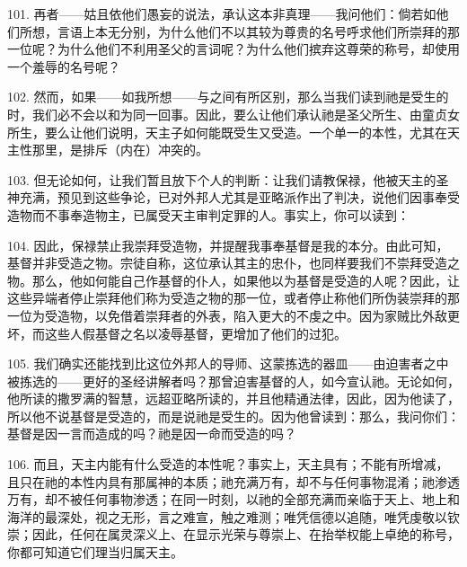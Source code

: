 101. 再者——姑且依他们愚妄的说法，承认这本非真理——我问他们：倘若如他们所想，言语上本无分别，为什么他们不以其较为尊贵的名号呼求他们所崇拜的那一位呢？为什么他们不利用圣父的言词呢？为什么他们摈弃这尊荣的称号，却使用一个羞辱的名号呢？\par

102. 然而，如果——如我所想——与之间有所区别，那么当我们读到祂是受生的时，我们必不会以和为同一回事。因此，要么让他们承认祂是圣父所生、由童贞女所生，要么让他们说明，天主子如何能既受生又受造。一个单一的本性，尤其在天主性那里，是排斥（内在）冲突的。\par

103. 但无论如何，让我们暂且放下个人的判断：让我们请教保禄，他被天主的圣神充满，预见到这些争论，已对外邦人尤其是亚略派作出了判决，说他们因事奉受造物而不事奉造物主，已属受天主审判定罪的人。事实上，你可以读到：\par

104. 因此，保禄禁止我崇拜受造物，并提醒我事奉基督是我的本分。由此可知，基督并非受造之物。宗徒自称，这位承认其主的忠仆，也同样要我们不崇拜受造之物。那么，他如何能自己作基督的仆人，如果他以为基督是受造的人呢？因此，让这些异端者停止崇拜他们称为受造之物的那一位，或者停止称他们所伪装崇拜的那一位为受造物，以免借着崇拜者的外表，陷入更大的不虔之中。因为家贼比外敌更坏，而这些人假基督之名以凌辱基督，更增加了他们的过犯。\par

105. 我们确实还能找到比这位外邦人的导师、这蒙拣选的器皿——由迫害者之中被拣选的——更好的圣经讲解者吗？那曾迫害基督的人，如今宣认祂。无论如何，他所读的撒罗满的智慧，远超亚略所读的，并且他精通法律，因此，因为他读了，所以他不说基督是受造的，而是说祂是受生的。因为他曾读到：那么，我问你们：基督是因一言而造成的吗？祂是因一命而受造的吗？\par

106. 而且，天主内能有什么受造的本性呢？事实上，天主具有；不能有所增减，且只在祂的本性内具有那属神的本质；祂充满万有，却不与任何事物混淆；祂渗透万有，却不被任何事物渗透；在同一时刻，以祂的全部充满而亲临于天上、地上和海洋的最深处，视之无形，言之难宣，触之难测；唯凭信德以追随，唯凭虔敬以钦崇；因此，任何在属灵深义上、在显示光荣与尊崇上、在抬举权能上卓绝的称号，你都可知道它们理当归属天主。\par

